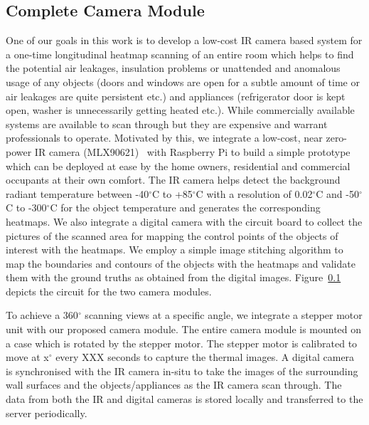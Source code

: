 \documentclass{sig-alternate}
\begin{document}
\subsection{Complete Camera Module}
One of our goals in this work is to develop a low-cost IR camera based system for a one-time longitudinal heatmap scanning of an entire room which helps to find the potential air leakages, insulation problems or unattended and anomalous usage of any objects (doors and windows are open for a subtle amount of time or air leakages are quite persistent etc.) and appliances (refrigerator door is kept open, washer is unnecessarily getting heated etc.). While commercially available systems are available to scan through but they are expensive and warrant professionals to operate. Motivated by this, we integrate a low-cost, near zero-power IR camera (MLX90621)~\cite{} with Raspberry Pi to build a simple prototype which can be deployed at ease by the home owners, residential and commercial occupants at their own comfort. %
The IR camera helps detect the background radiant temperature between -40$^{\circ}$C to +85$^{\circ}$C with a resolution of 0.02$^{\circ}$C and -50$^{\circ}$C to -300$^{\circ}$C for the object temperature and generates the corresponding heatmaps. We also integrate a digital camera with the circuit board to collect the  pictures of the scanned area for mapping the control points of the objects of interest with the heatmaps. We employ a simple image stitching algorithm to map the boundaries and contours of the objects with the heatmaps and validate them with the ground truths as obtained from the digital images. Figure~\ref{} depicts the circuit for the two camera modules.
	
To achieve a 360$^{\circ}$ scanning views at a specific angle, we integrate a stepper motor unit with our proposed camera module. The entire camera module is mounted on a case which is rotated by the stepper motor. The stepper motor is calibrated to move at x$^{\circ}$ every XXX seconds to capture the thermal images. A digital camera is synchronised with the IR camera in-situ to take the images of the surrounding wall surfaces and the objects/appliances as the IR camera scan through. The data from both the IR and digital cameras is stored locally and transferred to the server periodically.
	
\end{document}
